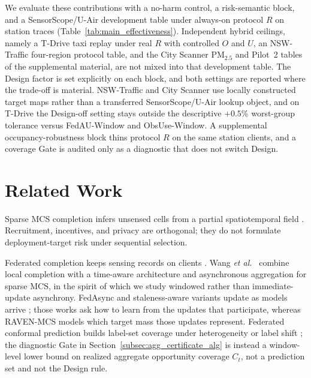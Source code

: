 \documentclass[letterpaper,journal]{IEEEtran}
\begin{document}
We evaluate these contributions with a no-harm control, a risk-semantic block,
and a SensorScope/U-Air development table under always-on protocol $R$ on station
traces (Table~\ref{tab:main_effectiveness}).  Independent hybrid ceilings, namely
a T-Drive taxi replay under real $R$ with controlled $O$ and $U$, an NSW-Traffic
four-region protocol table, and the City Scanner {PM}$_{2.5}$ and Pilot~2 tables
of the supplemental material, are not mixed into that development table.  The
Design factor is set explicitly on each block, and both settings are reported
where the trade-off is material.  NSW-Traffic and City Scanner use locally
constructed target maps rather than a transferred SensorScope/U-Air lookup
object, and on T-Drive the Design-off setting stays outside the descriptive
$+0.5\%$ worst-group tolerance versus FedAU-Window and ObsUse-Window.  A
supplemental occupancy-robustness block thins protocol $R$ on the same station
clients, and a coverage Gate is audited only as a diagnostic that does not switch
Design.


\section{Related Work}
\label{sec:related_work}

Sparse MCS completion infers unsensed cells from a partial spatiotemporal
field
\cite{ganti2011mobile,guo2015mobile,ma2014opportunities,wang2023spatiotemporal,wang2023outlier,wang2023transformer,wang2024fewshot,li2024robust,wang2025evolutionary,xu2025rethinking,liu2026pyramid,zhang2026mapt,liu2026pricing}.
Recruitment, incentives, and privacy
\cite{liu2026multidimensional,zhang2025incentive,lu2025piece,zhang2026locally}
are orthogonal; they do not formulate deployment-target risk under sequential
selection.

Federated completion keeps sensing records on clients
\cite{mcmahan2017communication,yang2019federated,kairouz2021advances,li2020federated}.
Wang \emph{et al.}~\cite{wang2026federated} combine local completion with a
time-aware architecture and asynchronous aggregation for sparse MCS, in the
spirit of which we study windowed rather than immediate-update asynchrony.
FedAsync and staleness-aware variants update as models arrive
\cite{xie2019asynchronous,liu2023adaptive,sun2024staleness,islam2025seafl,li2026stdfl};
those works ask how to learn from the updates that participate, whereas
RAVEN-MCS models which target mass those updates represent.  Federated conformal
prediction builds label-set coverage under heterogeneity or label shift
\cite{lu2023federated,plassier2023conformal}; the diagnostic Gate in
Section~\ref{subsec:agg_certificate_alg} is instead a window-level lower bound on
realized aggregate opportunity coverage $C_t$, not a prediction set and not the
Design rule.
\end{document}
